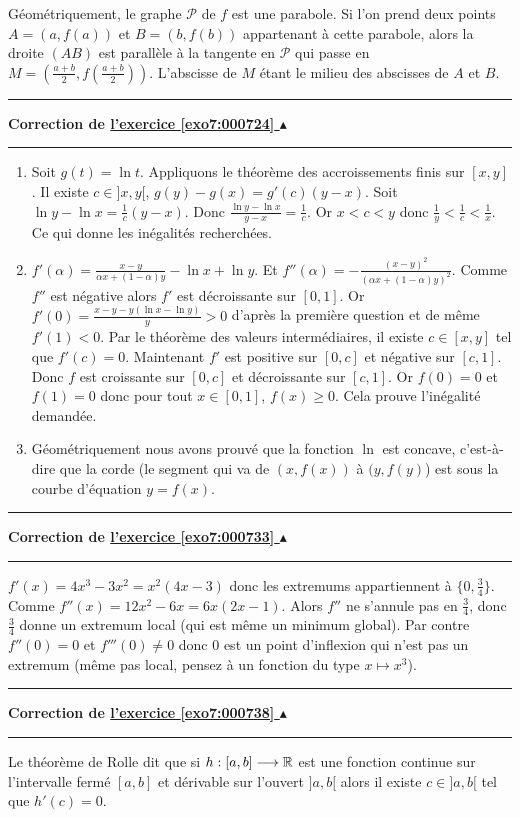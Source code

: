 \documentclass[11pt,a4paper]{article}
\newcounter{exo}
\newcommand{\correction}[1]{\hypertarget{cor7:#1}{}\label{cor7:#1}{\bf Correction de \hyperlink{exo7:#1}{l'exercice \ref{exo7:#1} $\blacktriangle$}}\vspace{1mm}\hrule\vspace{1mm}}
\newcommand{\fincorrection}{\vspace{1mm}\hrule\vspace*{7mm}}
\begin{document}
G\'eom\'etriquement, le graphe $\mathcal{P}$ de $f$ est une parabole.
Si l'on prend deux points $A = (a,f(a))$ et $B = (b,f(b))$ appartenant 
à cette parabole, alors la droite $(AB)$
est parall\`ele \`a la tangente en $\mathcal{P}$ qui passe en $M=(\frac{a+b}{2}, f(\frac{a+b}{2}))$.
L'abscisse de $M$ étant le milieu des abscisses de $A$ et $B$.
\fincorrection
\correction{000724}
\begin{enumerate}
  \item Soit $g(t) = \ln t$. Appliquons le th\'eor\`eme des accroissements finis sur $[x,y]$. Il existe $c \in ]x,y[$, 
$g(y)-g(x) = g'(c)(y-x)$. Soit $\ln y - \ln x = \frac 1c (y-x)$.
Donc $\frac{\ln y - \ln x}{y-x} = \frac 1c$.
Or $x <c<y$ donc $\frac 1y < \frac 1c < \frac 1x$.
Ce qui donne les in\'egalit\'es recherch\'ees. 
  \item $f'(\alpha)= \frac{x-y}{\alpha x + (1-\alpha)y} - \ln x + \ln y$. Et $f''(\alpha) = -\frac{(x-y)^2}{(\alpha x + (1-\alpha)y)^2}$.
Comme $f''$ est n\'egative alors $f'$ est d\'ecroissante sur $[0,1]$.
Or $f'(0) = \frac{x-y - y(\ln x - \ln y)}{y} >0$ d'apr\`es la premi\`ere question et de m\^eme $f'(1) < 0$. Par le th\'eor\`eme des valeurs interm\'ediaires, il existe $c \in [x,y]$ tel que $f'(c) = 0$.
Maintenant $f'$ est positive sur $[0,c]$ et n\'egative sur $[c,1]$.
Donc $f$ est croissante sur $[0,c]$ et d\'ecroissante sur $[c,1]$.
Or $f(0)=0$ et $f(1)=0$ donc pour tout $x\in[0,1]$, $f(x) \geq 0$.
Cela prouve l'in\'egalit\'e demand\'ee.
  \item G\'eom\'etriquement nous avons prouv\'e que la fonction $\ln$
est concave, c'est-\`a-dire que la corde
(le segment qui va de $(x,f(x))$ \`a $(y,f(y)$) est sous la courbe d'\'equation $y=f(x)$.
\end{enumerate}
\fincorrection
\correction{000733}
$f'(x) = 4x^3-3x^2 = x^2(4x-3)$ donc les extremums
appartiennent à  $\{0,\frac 34\}$. Comme $f''(x) = 12x^2-6x
= 6x(2x-1)$. Alors $f''$ ne s'annule pas en $\frac 34$, donc
$\frac 34$ donne un extremum local (qui est même un minimum global).
Par contre $f''(0) = 0$ et $f'''(0)\not=0$ donc $0$ est
un point d'inflexion qui n'est pas un extremum (m\^eme pas local,
pensez \`a un fonction du type  $x \mapsto x^3$). 
\fincorrection
\correction{000738}

 Le th\'eor\`eme de Rolle dit que si $h :[a,b]
\longrightarrow \mathbb{R}$ est une fonction continue sur l'intervalle
ferm\'e $[a,b]$ et d\'erivable sur l'ouvert $]a,b[$ alors il
existe $c \in ]a,b[$ tel que $h' (c) = 0.$
\end{document}
